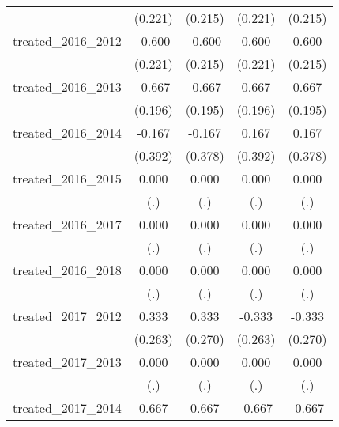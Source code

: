 {\begin{tabular}{l*{4}{c}}
            &     (0.221)         &     (0.215)         &     (0.221)         &     (0.215)         \\
[1em]
treated\_2016\_2012&      -0.600\sym{**} &      -0.600\sym{**} &       0.600\sym{**} &       0.600\sym{**} \\
            &     (0.221)         &     (0.215)         &     (0.221)         &     (0.215)         \\
[1em]
treated\_2016\_2013&      -0.667\sym{***}&      -0.667\sym{***}&       0.667\sym{***}&       0.667\sym{***}\\
            &     (0.196)         &     (0.195)         &     (0.196)         &     (0.195)         \\
[1em]
treated\_2016\_2014&      -0.167         &      -0.167         &       0.167         &       0.167         \\
            &     (0.392)         &     (0.378)         &     (0.392)         &     (0.378)         \\
[1em]
treated\_2016\_2015&       0.000         &       0.000         &       0.000         &       0.000         \\
            &         (.)         &         (.)         &         (.)         &         (.)         \\
[1em]
treated\_2016\_2017&       0.000         &       0.000         &       0.000         &       0.000         \\
            &         (.)         &         (.)         &         (.)         &         (.)         \\
[1em]
treated\_2016\_2018&       0.000         &       0.000         &       0.000         &       0.000         \\
            &         (.)         &         (.)         &         (.)         &         (.)         \\
[1em]
treated\_2017\_2012&       0.333         &       0.333         &      -0.333         &      -0.333         \\
            &     (0.263)         &     (0.270)         &     (0.263)         &     (0.270)         \\
[1em]
treated\_2017\_2013&       0.000         &       0.000         &       0.000         &       0.000         \\
            &         (.)         &         (.)         &         (.)         &         (.)         \\
[1em]
treated\_2017\_2014&       0.667\sym{*}  &       0.667\sym{**} &      -0.667\sym{*}  &      -0.667\sym{**} \\

\end{tabular}}
